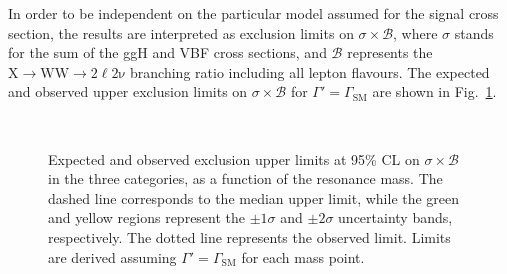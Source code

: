 In order to be independent on the particular model assumed for the signal cross section, the results are interpreted as exclusion limits on $\sigma \times \mathcal{B}$, where $\sigma$ stands for the sum of the ggH and VBF cross sections, and $\mathcal{B}$ represents the $\mathrm{X\to WW \to2\ell2\nu}$ branching ratio including all lepton flavours. The expected and observed upper exclusion limits on $\sigma \times \mathcal{B}$ for $\Gamma' = \Gamma_\mathrm{SM}$ are shown in Fig.~\ref{fig:13TeVobslim}.

\begin{figure}[htb]
\centering
{}
\\
\caption{Expected and observed exclusion upper limits at 95\% CL on $\sigma \times \mathcal{B}$ in the three categories, as a function of the resonance mass. The dashed line corresponds to the median upper limit, while the green and yellow regions represent the $\pm 1\sigma$ and $\pm 2 \sigma$ uncertainty bands, respectively. The dotted line represents the observed limit. Limits are derived assuming $\Gamma' = \Gamma_\mathrm{SM}$ for each mass point.}\label{fig:13TeVobslim}
\end{figure}

